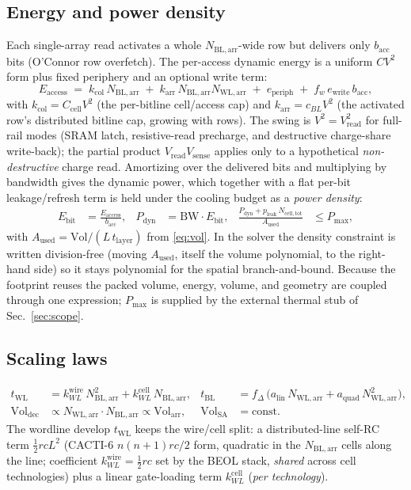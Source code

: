 \documentclass[11pt]{article}
\newcommand{\Nbl}{N_{\mathrm{BL,arr}}}
\newcommand{\Nwl}{N_{\mathrm{WL,arr}}}
\newcommand{\twl}{t_{\mathrm{WL}}}
\newcommand{\tbl}{t_{\mathrm{BL}}}
\newcommand{\Volarr}{\mathrm{Vol}_{\mathrm{arr}}}
\newcommand{\Volsa}{\mathrm{Vol}_{\mathrm{SA}}}
\newcommand{\Voldec}{\mathrm{Vol}_{\mathrm{dec}}}
\newcommand{\bacc}{b_{\mathrm{acc}}}          %
\newcommand{\Eacc}{E_{\mathrm{access}}}
\newcommand{\Ebit}{E_{\mathrm{bit}}}
\newcommand{\Pdyn}{P_{\mathrm{dyn}}}
\newcommand{\Pmax}{P_{\max}}
\newcommand{\Aused}{A_{\mathrm{used}}}
\newcommand{\tlayer}{t_{\mathrm{layer}}}
\newcommand{\Ncell}{N_{\mathrm{cell,tot}}}
\begin{document}
\subsection{Energy and power density}
Each single-array read activates a whole $\Nbl$-wide row but delivers only
$\bacc$ bits (O'Connor row overfetch). The per-access dynamic energy is a
uniform $CV^2$ form plus fixed periphery and an optional write term:
\begin{equation}
  \Eacc \;=\; k_{\mathrm{col}}\,\Nbl \;+\; k_{\mathrm{arr}}\,\Nbl\Nwl
         \;+\; e_{\mathrm{periph}} \;+\; f_w\,e_{\mathrm{write}}\,\bacc,
  \label{eq:eacc}
\end{equation}
with $k_{\mathrm{col}}=C_{\mathrm{cell}}V^2$ (the per-bitline cell/access cap)
and $k_{\mathrm{arr}}=c_{BL}V^2$ (the activated row's distributed bitline cap,
growing with rows). The swing is $V^2=V_{\mathrm{read}}^2$ for full-rail modes
(SRAM latch, resistive-read precharge, and destructive charge-share write-back);
the partial product $V_{\mathrm{read}}V_{\mathrm{sense}}$ applies only to a
hypothetical \emph{non-destructive} charge read. Amortizing over the delivered
bits and multiplying by bandwidth gives the dynamic power, which together with a
flat per-bit leakage/refresh term is held under the cooling budget as a
\emph{power density}:
\begin{align}
  \Ebit &= \frac{\Eacc}{\bacc}, &
  \Pdyn &= \mathrm{BW}\cdot\Ebit, &
  \frac{\Pdyn + p_{\mathrm{leak}}\,\Ncell}{\Aused} &\le \Pmax,
  \label{eq:power}
\end{align}
with $\Aused=\mathrm{Vol}/(L\,\tlayer)$ from \eqref{eq:vol}. In the solver the
density constraint is written division-free (moving $\Aused$, itself the volume
polynomial, to the right-hand side) so it stays polynomial for the spatial
branch-and-bound. Because the footprint reuses the packed volume, energy,
volume, and geometry are coupled through one expression; $\Pmax$ is supplied by
the external thermal stub of Sec.~\ref{sec:scope}.

\subsection{Scaling laws}
\begin{align}
  \twl &= k^{\mathrm{wire}}_{WL}\,\Nbl^2 + k^{\mathrm{cell}}_{WL}\,\Nbl, &
  \tbl &= f_\Delta\,\bigl(a_{\mathrm{lin}}\,\Nwl + a_{\mathrm{quad}}\,\Nwl^2\bigr), \\
  \Voldec &\propto \Nwl\cdot\Nbl \propto \Volarr, &
  \Volsa  &= \text{const}.
  \label{eq:scaling}
\end{align}
The wordline develop $\twl$ keeps the wire/cell split: a distributed-line
self-RC term $\tfrac12 rc L^2$ (CACTI-6 $n(n{+}1)rc/2$ form, quadratic in the
$\Nbl$ cells along the line; coefficient $k^{\mathrm{wire}}_{WL}=\tfrac12 rc$
set by the BEOL stack, \emph{shared} across cell technologies) plus a linear
gate-loading term $k^{\mathrm{cell}}_{WL}$ (\emph{per technology}).
\end{document}
